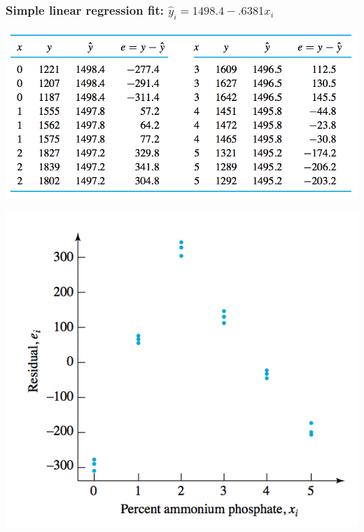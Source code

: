 \documentclass[handout]{beamer}
\providecommand{\wh}[1]{\widehat{#1}}
\numberwithin{equation}{section}
\begin{document}
\begin{frame}
\frametitle{Simple linear regression fit: $\wh{y}_i = 1498.4 - .6381x_i$}
\begin{center}
 \includegraphics{../../fig/flyashdataresid.png}
\end{center}
\begin{minipage}[b]{.48\linewidth}
 \includegraphics{../../fig/flyashslrfit.png}
\end{minipage}
\begin{minipage}[b]{.48\linewidth}

\end{minipage}
\end{frame}
\end{document}

